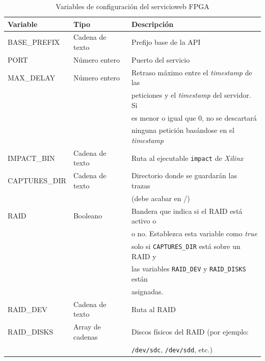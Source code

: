 \begin{table}
\centering
\begin{tabular}{|l|l|l|}
\hline
\rowcolor[HTML]{F5F5F5}
\textbf{Variable}   & \textbf{Tipo}    & \textbf{Descripción}                                           \\ \hline
BASE\_PREFIX        & Cadena de texto  & Prefijo base de la \gls{API}                                   \\ \hline
PORT                & Número entero    & Puerto del servicio                                            \\ \hline
MAX\_DELAY          & Número entero    & Retraso máximo entre el \textit{timestamp} de las              \\
                    &                  & peticiones y el \textit{timestamp} del servidor. Si            \\
                    &                  & es menor o igual que 0, no se descartará                       \\
                    &                  & ninguna petición basándose en el \textit{timestamp}            \\ \hline
IMPACT\_BIN         & Cadena de texto  & Ruta al ejecutable \texttt{impact} de \textit{Xilinx}          \\ \hline
CAPTURES\_DIR       & Cadena de texto  & Directorio donde se guardarán las \glspl{traza}                \\
                    &                  & (debe acabar en /)                                             \\ \hline
RAID                & Booleano         & Bandera que indica si el \gls{RAID} está activo o              \\
                    &                  & o no. Establezca esta variable como \textit{true}              \\
                    &                  & solo si \texttt{CAPTURES\_DIR} está sobre un \gls{RAID} y      \\
                    &                  & las variables \texttt{RAID\_DEV} y \texttt{RAID\_DISKS} están  \\
                    &                  & asignadas.                                                     \\ \hline
RAID\_DEV           & Cadena de texto  & Ruta al \gls{RAID}                                             \\ \hline
RAID\_DISKS         & Array de cadenas & Discos físicos del \gls{RAID} (por ejemplo:                    \\
                    &                  & \texttt{/dev/sdc}, \texttt{/dev/sdd}, etc.)                    \\ \hline
\end{tabular}
\caption{Variables de configuración del \gls{servicioweb} \gls{FPGA}}
\label{extra:manual:paramsfpga}
\end{table}


